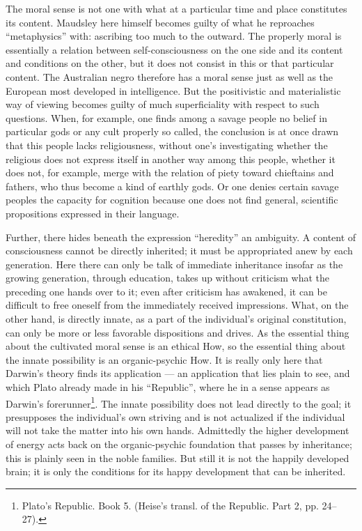 \documentclass[12pt,a4paper,openany]{book}
\newcommand{\opage}[1]{\marginnote{\footnotesize\textit{[#1]}}}
\begin{document}
\opage{329}The moral sense is not one with what at a particular
time and place constitutes its content. Maudsley here
himself becomes guilty of what he reproaches ``metaphysics'' with:
ascribing too much to the outward. The properly moral is
essentially a relation between self-consciousness on the one
side and its content and conditions on the other,
but it does not consist in this or that particular content. The Australian negro
therefore has a moral sense just as well as the European most
developed in intelligence. But the positivistic
and materialistic way of viewing becomes guilty of much
superficiality with respect to such questions. When,
for example, one finds among a savage people no belief in
particular gods or any cult properly so called, the conclusion is
at once drawn that this people lacks religiousness, without
one's investigating whether the religious does not express itself
in another way among this people, whether it does not, for example,
merge with the relation of piety toward chieftains and fathers, who thus
become a kind of earthly gods. Or one denies
certain savage peoples the capacity for cognition because one does not find
general, scientific propositions expressed in their language.

Further, there hides beneath the expression ``heredity''
an ambiguity. A content of consciousness cannot be directly
inherited; it must be appropriated anew by each generation. Here
there can only be talk of immediate inheritance insofar as the growing
generation, through education, takes up without criticism
what the preceding one hands over to it; even after criticism has
awakened, it can be difficult to free oneself from the immediately
received impressions. What, on the other hand, is directly innate,
as a part of the individual's original constitution,
can only be more or less favorable dispositions and
drives. As the essential thing about the cultivated moral
sense is an ethical How, so the essential thing about
the innate possibility is an organic-psychic How. It is
really only here that Darwin's theory finds its application
--- an application that lies plain to see, and
which Plato already made in his ``Republic'', where he
\opage{330}in a sense appears as Darwin's forerunner\footnote{Plato's Republic. Book 5. (Heise's transl. of the Republic. Part 2, pp. 24--27).}. The innate
possibility does not lead directly to the goal; it presupposes
the individual's own striving and is not actualized if the individual
will not take the matter into his own hands. Admittedly the
higher development of energy acts back on the organic-psychic
foundation that passes by inheritance; this is plainly seen in the noble
families. But still it is not the happily developed brain;
it is only the conditions for its happy development that
can be inherited.
\end{document}
